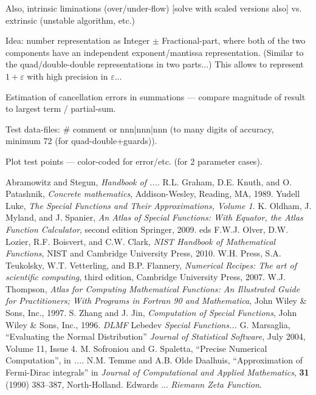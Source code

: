 \documentclass[10pt,dvipdfmx,letterpaper,twoside]{article}
\let\eps=\varepsilon
\begin{document}
Also, intrinsic liminations (over/under-flow) [solve with scaled versions also]
vs. extrinsic (unstable algorithm, etc.)

Idea: number representation as Integer $\pm$ Fractional-part, where both of the two components
have an independent exponent/mantissa representation.  (Similar to the quad/double-double representations
in two parts...)  This allows to represent $1+\eps$ with high precision in $\eps$...

Estimation of cancellation errors in summations --- compare magnitude of result to largest term / partial-sum.

Test data-files: \# comment or nnn|nnn|nnn (to many digits of accuracy, minimum 72 (for quad-double+guards)).

Plot test points --- color-coded for error/etc. (for 2 parameter cases).

%

\begin{thebibliography}{WWWWW}
  Abramowitz and Stegun,
  \emph{Handbook of ...}.
R.L. Graham, D.E. Knuth, and O. Patashnik, \emph{Concrete
mathematics}, Addison-Wesley, Reading, MA, 1989.
  Yudell Luke,
  \emph{The Special Functions and Their Approximations, Volume 1}.
  K. Oldham, J. Myland, and J. Spanier,
  \emph{An Atlas of Special Functions: With Equator, the Atlas Function Calculator}, second edition
  Springer, 2009.
  eds F.W.J. Olver, D.W. Lozier, R.F. Boisvert, and C.W. Clark,
  \emph{NIST Handbook of Mathematical Functions},
  NIST and Cambridge University Press, 2010.
  W.H. Press, S.A. Teukolsky, W.T. Vetterling, and B.P. Flannery,
  \emph{Numerical Recipes: The art of scientific computing}, third edition,
  Cambridge University Press, 2007.
  W.J. Thompson,
  \emph{Atlas for Computing Mathematical Functions: An Illustrated Guide for Practitioners; With Programs in Fortran 90 and Mathematica},
  John Wiley \& Sons, Inc., 1997.
  S. Zhang and J. Jin,
  \emph{Computation of Special Functions},
  John Wiley \& Sons, Inc., 1996.
  \emph{DLMF}
  Lebedev
  \emph{Special Functions...}
  G. Marsaglia,
  ``Evaluating the Normal Distribution''
  \emph{Journal of Statistical Software},
  July 2004, Volume 11, Issue 4.
  M. Sofroniou and G. Spaletta,
  ``Precise Numerical Computation'',
  in \emph{...}.
  N.M. Temme and A.B. Olde Daalhuis,
  ``Approximation of Fermi-Dirac integrals''
  in \emph{Journal of Computational and Applied Mathematics},
  {\bf 31} (1990) 383--387, North-Holland.
  Edwards ...
  \emph{Riemann Zeta Function}.
\end{thebibliography}
\end{document}

